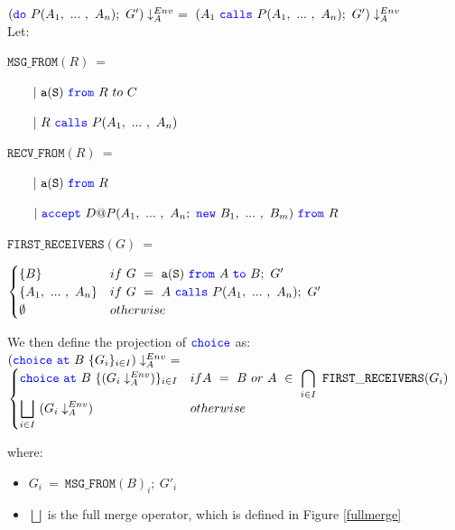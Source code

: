 \documentclass[12pt,twoside]{report}
\begin{document}
 $({\color{blue}\mathtt{do}}\ P(A_1,\ ...\ ,\ A_n);\ G') \downarrow_A^{Env}\ =\ (A_1\ {\color{blue}\mathtt{calls}}\ P(A_1,\ ...\ ,\ A_n);\ G') \downarrow_A^{Env}$\\
 
Let:

$\mathtt{MSG\_FROM}(R)\ =$

$\quad \quad |\ \scrmessage{a}{S}\ \from\ R\ to\ C$

$\quad \quad |\ R\ \calls\ P(\roles{A}{n})$

$\mathtt{RECV\_FROM}(R)\ =$

$\quad \quad |\ \scrmessage{a}{S}\ \from\ R$

$\quad \quad |\ \accept\ D@P(\roles{A}{n};\ \scrnew\ \roles{B}{m})\ \from\ R$

$\mathtt{FIRST\_RECEIVERS}(G)\ =$

\begin{math}
    \begin{cases}
        \{B\} & if\ G\ =\ \scrmessage{a}{S}\ \from\ A\ \scrto\ B;\ G'\\
        \{\roles{A}{n}\} & if\ G\ =\ A\ \calls\ P(\roles{A}{n});\ G'\\
        \emptyset & otherwise
    \end{cases}\\\\
\end{math}

We then define the projection of ${\color{blue}\mathtt{choice}}$ as:\\

 $({\color{blue}\mathtt{choice}}\ {\color{blue}\mathtt{at}}\ B\ \{G_i\}_{i \in I}) \downarrow_A^{Env}\ =$\\[3.5pt]
 \begin{math}
    \begin{cases}
        \choice\ \at\ B\ \{(G_i \project)\}_\varinset{i}{I} & if A\ =\ B\ or\ A\ \in\ \displaystyle \bigcap_\varinset{i}{I}\ \mathtt{FIRST\_RECEIVERS}(G_i)\\
        \displaystyle \bigsqcup_\varinset{i}{I}\ (G_i \project) & otherwise\\
    \end{cases}\\[2pt]
\end{math}

where:
\begin{itemize}
    \item $G_i\ =\ \mathtt{MSG\_FROM}(B)_i;\ G'_i$
    \item $\bigsqcup$ is the full merge operator, which is defined in Figure \ref{fullmerge}
\end{itemize}
 
\end{document}
